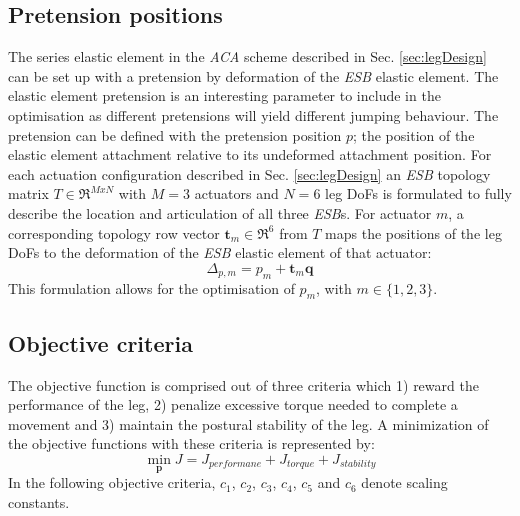 \documentclass[letterpaper, 10 pt, conference]{ieeeconf}  %
\begin{document}
\subsection{Pretension positions}

The series elastic element in the \textit{ACA} scheme described in Sec. \ref{sec:legDesign} can be set up with a pretension by deformation of the \textit{ESB} elastic element. The elastic element pretension is an interesting parameter to include in the optimisation as different pretensions will yield different jumping behaviour. The pretension can be defined with the pretension position $p$; the position of the elastic element attachment relative to its undeformed attachment position. For each actuation configuration described in Sec. \ref{sec:legDesign} an \textit{ESB} topology matrix $T \in \mathfrak{R}^{M x N}$ with $M=3$ actuators and $N=6$ leg DoFs is formulated to fully describe the location and articulation of all three \textit{ESB}s. For actuator $m$, a corresponding topology row vector $\mathbf{t}_m \in \mathfrak{R}^6$ from $T$ maps the positions of the leg DoFs to the deformation of the \textit{ESB} elastic element of that actuator:
\begin{equation}
\Delta_{p,m} = p_m + \mathbf{t}_m \mathbf{q}
\end{equation}
This formulation allows for the optimisation of $p_m$, with $m \in \{1,2,3\}$.

\subsection{Objective criteria}

The objective function is comprised out of three criteria which 1) reward the performance of the leg, 2) penalize excessive torque needed to complete a movement and 3) maintain the postural stability of the leg. A minimization of the objective functions with these criteria is represented by:   
 \begin{equation}
\min_{\mathbf{p}}\limits J =  J_{performane}+ J_{torque}+ J_{stability}
 \end{equation}
In the following objective criteria, $c_1$, $c_2$, $c_3$, $c_4$, $c_5$ and $c_6$ denote scaling constants.\\
\end{document}
